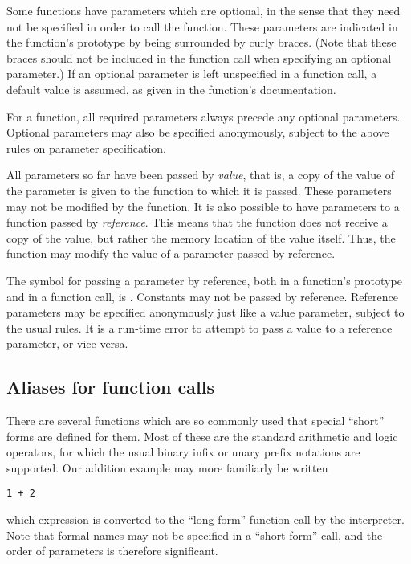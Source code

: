 Some functions have parameters which are optional, in the sense that they
need not be specified in order to call the function.  These parameters
are indicated in the function's prototype by being surrounded by curly
braces.  (Note that these braces should not be included in the function
call when specifying an optional parameter.)  If an optional parameter
is left unspecified in a function call, a default value is assumed, as
given in the function's documentation.

For a function, all required parameters always precede any optional
parameters.  Optional parameters may also be specified anonymously,
subject to the above rules on parameter specification.

All parameters so far have been passed by {\it value}, that is, a copy
of the value of the parameter is given to the function to which it is passed.
These parameters may not be modified by the function.  It is also possible
to have parameters to a function passed by {\it reference}.  This means
that the function does not receive a copy of the value, but rather the
memory location of the value itself.  Thus, the function may modify
the value of a parameter passed by reference.

The symbol for passing a parameter by reference, both in a function's
prototype and in a function call, is {\tt <->}.  Constants may not be
passed by reference.  Reference parameters may be specified anonymously
just like a value parameter, subject to the usual rules.  It is a run-time
error to attempt to pass a value to a reference parameter, or vice versa.

\subsection{Aliases for function calls}

There are several functions which are so commonly used that special
``short'' forms are defined for them.  Most of these are the
standard arithmetic and logic operators, for which the usual binary
infix or unary prefix notations are supported.  Our addition example
may more familiarly be written

\begin{verbatim}
1 + 2
\end{verbatim}

\noindent which expression is converted to the ``long form'' function
call by the interpreter.  Note that formal names may not be specified
in a ``short form'' call, and the order of parameters is therefore
significant.

